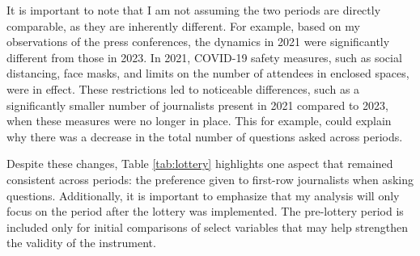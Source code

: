 

It is important to note that I am not assuming the two periods are directly comparable, as they are inherently different. For example, based on my observations of the press conferences, the dynamics in 2021 were significantly different from those in 2023. In 2021, COVID-19 safety measures, such as social distancing, face masks, and limits on the number of attendees in enclosed spaces, were in effect. These restrictions led to noticeable differences, such as a significantly smaller number of journalists present in 2021 compared to 2023, when these measures were no longer in place. This for example, could explain why there was a decrease in the total number of questions asked across periods.

Despite these changes, Table \ref{tab:lottery} highlights one aspect that remained consistent across periods: the preference given to first-row journalists when asking questions. Additionally, it is important to emphasize that my analysis will only focus on the period after the lottery was implemented. The pre-lottery period is included only for initial comparisons of select variables that may help strengthen the validity of the instrument.

